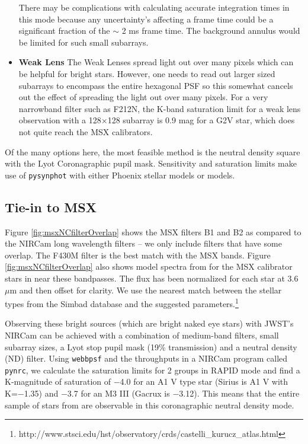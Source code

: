 \documentclass{aastex6}
\begin{document}
\begin{itemize}
There may be complications with calculating accurate integration times in this mode because any uncertainty's affecting a frame time could be a significant fraction of the $\sim$ 2 ms frame time.
The background annulus would be limited for such small subarrays.
\item \textbf{Weak Lens} The Weak Lenses spread light out over many pixels which can be helpful for bright stars. However, one needs to read out larger sized subarrays to encompass the entire hexagonal PSF so this somewhat cancels out the effect of spreading the light out over many pixels.
For a very narrowband filter such as F212N, the K-band saturation limit for a weak lens observation with a 128$\times$128 subarray is 0.9 mag for a G2V star, which does not quite reach the MSX calibrators.
\end{itemize}

Of the many options here, the most feasible method is the neutral density square with the Lyot Coronagraphic pupil mask.
Sensitivity and saturation limits make use of \texttt{pysynphot} \citep{lim2015pysynphot} with either Phoenix stellar models \citep{allard2012phoenix} or \citet{castelli2004models} models.

\subsection{Tie-in to MSX}

Figure \ref{fig:msxNCfilterOverlap} shows the MSX filters B1 and B2 as compared to the NIRCam long wavelength filters -- we only include filters that have some overlap.
The F430M filter is the best match with the MSX bands.
Figure \ref{fig:msxNCfilterOverlap} also shows model spectra from \citet{castelli2004models} for the MSX calibrator stars in \citet{price2004msxCal} near these bandpasses.
The flux has been normalized for each star at 3.6~$\mu$m and then offset for clarity.
We use the nearest match between the stellar types from the Simbad database and the suggested \citet{castelli2004models} parameters.\footnote{http://www.stsci.edu/hst/observatory/crds/castelli\_kurucz\_atlas.html}

Observing these bright sources (which are bright naked eye stars) with JWST's NIRCam can be achieved with a combination of medium-band filters, small subarray sizes, a Lyot stop pupil mask (19\% transmission) and a neutral density (ND) filter.
Using \texttt{webbpsf} and the throughputs in a NIRCam program called \texttt{pynrc}, we calculate the saturation limits for 2 groups in RAPID mode and find a K-magnitude of saturation of $-$4.0 for an A1 V type star (Sirius is A1 V with K=$-$1.35) and $-$3.7 for an M3 III (Gacrux is $-$3.12).
This means that the entire sample of stars from \citet{price2004msxCal} are observable in this coronagraphic neutral density mode.
\end{document}
